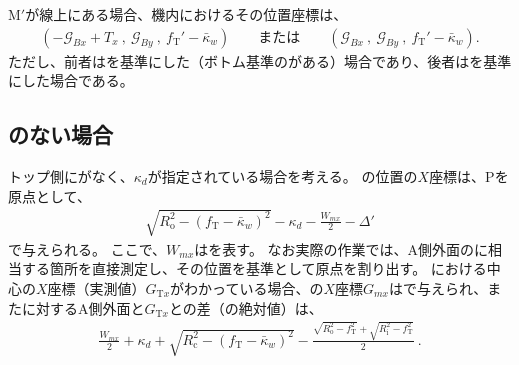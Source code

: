 \clearpage
\KeywayCenter M$'$が\TopOutcutCenter 線上にある場合、機内におけるその位置座標は、
\begin{align*}
  \left(
    -\mathcal G_{Bx}+T_x\ ,\
    \mathcal G_{By}\ ,\
    f_\mathrm T'-\bar\kappa_w
  \right) \qquad
  \text{または}\qquad
  \left(
    \mathcal G_{Bx}\ ,\
    \mathcal G_{By}\ ,\
    f_\mathrm T'-\bar\kappa_w
  \right).
\end{align*}
ただし、前者は\BottomOutcut を基準にした（ボトム基準の\CenterlineEndFaceDif がある）場合であり、後者は\TopOutcut を基準にした場合である。





\subsection{\Outcut のない場合}
トップ側に\Outcut がなく、\textbf{\AsideKeywayDepth}$\kappa_d$が指定されている場合を考える。
\KeywayCenter の位置の$X$座標は、\TableCenter Pを原点として、
\begin{align}
  \label{eq:mizocenterA}
  \sqrt{R_\mathrm o^2-(f_\mathrm T-\bar\kappa_w)^2}-\kappa_d-\frac{W_{mx}}2
  -\Delta'
\end{align}
で与えられる。
ここで、$W_{mx}$は\KeywayACOD を表す。
なお実際の作業では、A側外面の\KeywayCenter に相当する箇所を直接測定し、その位置を基準として原点を割り出す。
\TopEndFace における中心の$X$座標（実測値）$G_{\mathrm Tx}$がわかっている場合、\KeywayCenter の$X$座標$G_{mx}$はで与えられ、また\KeywayCenter に対するA側外面と$G_{\mathrm Tx}$との差（の絶対値）は、
\begin{align}
  \label{eq:mizocenterAd}
  \frac{W_{mx}}2+\kappa_d
  +\sqrt{R_\mathrm c^2-(f_\mathrm T-\bar\kappa_w)^2}
  -\frac{\sqrt{R_\mathrm o^2-f_\mathrm T^2}+\sqrt{R_\mathrm i^2-f_\mathrm T^2}}2\ .
\end{align}


